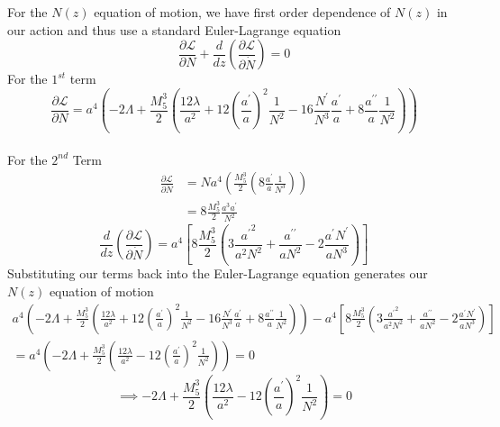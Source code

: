 \documentclass[11pt]{report}
\numberwithin{equation}{chapter}
\begin{document}
For the $N(z)$ equation of motion, we have first order dependence of $N(z)$ in our action and thus use a standard Euler-Lagrange equation
\begin{equation}
    \frac{\partial\mathcal{L}}{\partial N} + \frac{d}{dz}\left(\frac{\partial\mathcal{L}}{\partial \Dot{N}}\right) = 0 
\end{equation}
For the $1^{st}$ term
\begin{equation}
    \frac{\partial\mathcal{L}}{\partial N}=a^4\left(-2\Lambda +\frac{M^3_5}{2}\left(\frac{12\lambda}{a^2}+12\left(\frac{a^\prime}{a}\right)^2\frac{1}{N^2}-16\frac{N^\prime}{N^3}\frac{a^\prime}{a}+8\frac{a^{\prime\prime}}{a}\frac{1}{N^2}\right)\right)
\end{equation}\\
For the $2^{nd}$ Term
\begin{align*}
    \frac{\partial\mathcal{L}}{\partial \Dot{N}}&=Na^4\left(\frac{M^3_5}{2}\left(8\frac{a^\prime}{a}\frac{1}{N^3}\right)\right)\\
    &=8\frac{M^3_5}{2}\frac{a^3{a^\prime}}{N^2}
\end{align*}
\begin{equation}
    \frac{d}{dz}\left(\frac{\partial\mathcal{L}}{\partial \Dot{N}}\right)=a^4\left[8\frac{M^3_5}{2}\left(3\frac{{a^{\prime}}^2}{a^{2} N^{2}}+\frac{a^{\prime \prime}}{aN^2}-2\frac{a^{\prime} N^{\prime}}{aN^3}\right)\right]
\end{equation}
Substituting our terms back into the Euler-Lagrange equation generates our $N(z)$ equation of motion
\begin{multline}    
      a^4\left(-2\Lambda +\frac{M^3_5}{2}\left(\frac{12\lambda}{a^2}+12\left(\frac{a^\prime}{a}\right)^2\frac{1}{N^2}-16\frac{N^\prime}{N^3}\frac{a^\prime}{a}+8\frac{a^{\prime\prime}}{a}\frac{1}{N^2}\right)\right)
      - a^4\left[8\frac{M^3_5}{2}\left(3\frac{{a^{\prime}}^2}{a^{2} N^{2}}+\frac{a^{\prime \prime}}{aN^2}-2\frac{a^{\prime} N^{\prime}}{aN^3}\right)\right]\\
      = a^4\left(-2\Lambda +\frac{M^3_5}{2}\left(\frac{12\lambda}{a^2}-12\left(\frac{a^\prime}{a}\right)^2\frac{1}{N^2}\right)\right)=0
\end{multline}
\begin{equation}
    \implies -2\Lambda +\frac{M^3_5}{2}\left(\frac{12\lambda}{a^2}-12\left(\frac{a^\prime}{a}\right)^2\frac{1}{N^2}\right) = 0
\end{equation}
\end{document}

